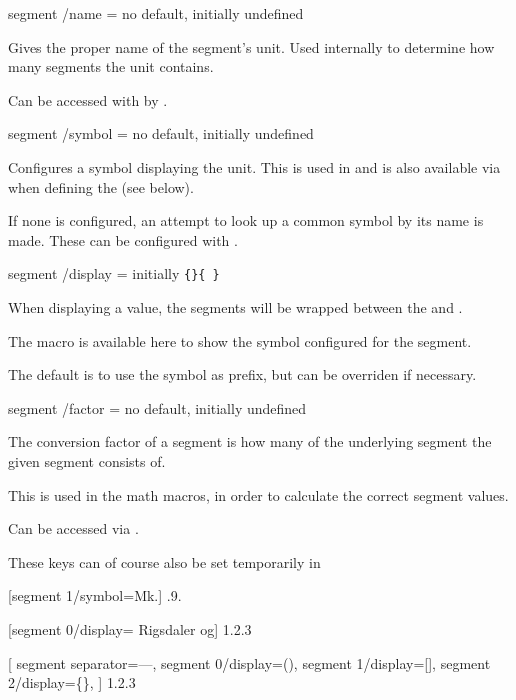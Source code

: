 \documentclass{article}
\begin{document}
\begin{docKey}
	[]
	[doc label=segment:name]
	{segment /name}
	{=}
	{no default, initially undefined}

	Gives the proper name of the segment's unit. Used internally to determine how many segments the unit contains.
	
	Can be accessed with by .
\end{docKey}

\begin{docKey}
	[]
	[doc label=segment:symbol]
	{segment /symbol}
	{=}
	{no default, initially undefined}

	Configures a symbol displaying the unit. This is used in  and is also available via  when defining the  (see below).
	
	If none is configured, an attempt to look up a common symbol by its name is made. These can be configured with .
\end{docKey}

\begin{docKey}
	[]
	[doc label=segment:display]
	{segment /display}
	{=}
	{initially \texttt{\{\}\{ \}}}

	When displaying a value, the segments will be wrapped between the  and .
	
	The macro  is available here to show the symbol configured for the segment.
	
	The default is to use the symbol as prefix, but can be overriden if necessary.
\end{docKey}

\begin{docKey}
	[]
	[doc label=segment:factor]
	{segment /factor}
	{=}
	{no default, initially undefined}
	
	The conversion factor of a segment is how many of the underlying segment the given segment consists of.
	
	This is used in the math macros, in order to calculate the correct segment values.
	
	Can be accessed via .
\end{docKey}

These keys can of course also be set temporarily in 

\begin{dispExample}
	[segment 1/symbol=Mk.]
	{.9.}

	[segment 0/display={}{ Rigsdaler og}]
	{1.2.3}

[
		segment separator={---},
		segment 0/display={(}{)},
		segment 1/display={[}{]},
		segment 2/display={\{}{\}},
	]
	{1.2.3}
\end{dispExample}
\end{document}
